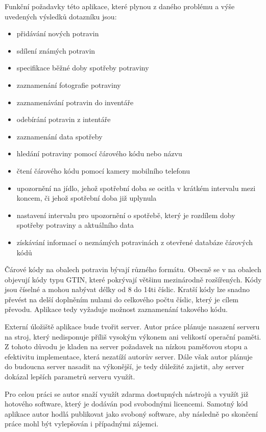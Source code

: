 \documentclass[thesis=B,czech]{FITthesis}[2013/10/20]
\begin{document}
Funkční požadavky této aplikace, které plynou z daného problému a výše uvedených výsledků dotazníku jsou:

\begin{itemize}
  \item přidávání nových potravin
  \item sdílení známých potravin
  \item specifikace běžné doby spotřeby potraviny
  \item zaznamenání fotografie potraviny
  \item zaznamenávání potravin do inventáře
  \item odebírání potravin z intentáře
  \item zaznamenání data spotřeby
  \item hledání potraviny pomocí čárového kódu nebo názvu
  \item čtení čárového kódu pomocí kamery mobilního telefonu
  \item upozornění na jídlo, jehož spotřební doba se ocitla v krátkém intervalu mezi koncem, či jehož spotřební doba již uplynula
  \item nastavení intervalu pro upozornění o spotřebě, který je rozdílem doby spotřeby potraviny a aktuálního data
  \item získávání informací o neznámých potravinách z otevřené databáze čárových kódů
\end{itemize}

Čárové kódy na obalech potravin bývají různého formátu. Obecně se v na obalech objevují kódy typu GTIN, které pokrývají většinu mezinárodně rozšířených. Kódy jsou číselné a mohou nabývat délky od 8 do 14ti číslic. Kratší kódy lze snadno převést na delší doplněním nulami do celkového počtu číslic, který je cílem převodu. Aplikace tedy vyžaduje možnost zaznamenání takového kódu.

Externí úložiště aplikace bude tvořit server. Autor práce plánuje nasazení serveru na stroj, který nedisponuje příliš vysokým výkonem ani velikostí operační paměti. Z tohoto důvodu je kladen na server požadavek na nízkou paměťovou stopu a efektivitu implementace, která nezatíží autorův server. Dále však autor plánuje do budoucna server nasadit na výkonější, je tedy důležité zajistit, aby server dokázal lepších parametrů serveru využít.

Pro celou práci se autor snaží využít zdarma dostupných nástrojů a využít již hotového software, který je dodáván pod svobodnými licencemi. Samotný kód aplikace autor hodlá publikovat jako svoboný software, aby následně po skončení práce mohl být vylepšován i případnými zájemci.
\end{document}
